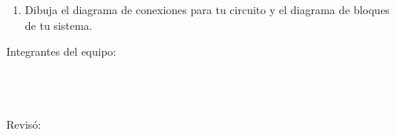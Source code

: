	\begin{enumerate}
		\item Dibuja el diagrama de conexiones para tu circuito y el diagrama de bloques de tu sistema. \newline \newline \newline \newline \newline \newline \newline \newline \newline \newline \newline \newline \newline \newline \newline \newline \newline \newline \newline \newline \newline \newline \newline \newline \newline \newline \newline \newline
	\end{enumerate}

	Integrantes del equipo: \\[0.2cm]
	\horrule{0.5pt} \\[0.2cm] %
	\horrule{0.5pt} \\[0.2cm] %
	\horrule{0.5pt} \\[0.2cm] %
	\horrule{0.5pt} %

	Revisó: \\[0.2cm]
	\horrule{0.5pt} \\%



